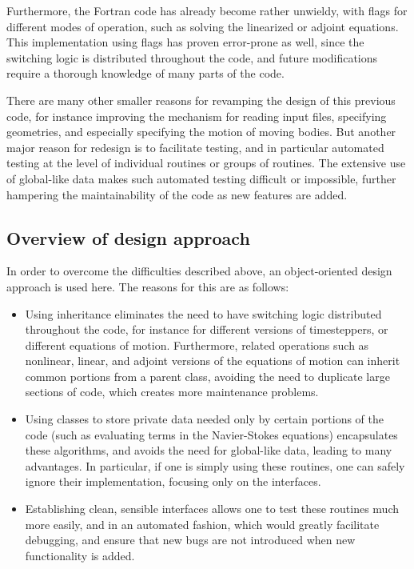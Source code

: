 \documentclass[11pt]{article}
\begin{document}
Furthermore, the Fortran code has already become rather unwieldy, with flags for different modes of operation, such as solving the linearized or adjoint equations.  This implementation using flags has proven error-prone as well, since the switching logic is distributed throughout the code, and future modifications require a thorough knowledge of many parts of the code.

There are many other smaller reasons for revamping the design of this previous code, for instance improving the mechanism for reading input files, specifying geometries, and especially specifying the motion of moving bodies.  But another major reason for redesign is to facilitate testing, and in particular automated testing at the level of individual routines or groups of routines.  The extensive use of global-like data makes such automated testing difficult or impossible, further hampering the maintainability of the code as new features are added.

\subsection{Overview of design approach}
In order to overcome the difficulties described above, an object-oriented design approach is used here.  The reasons for this are as follows:
\begin{itemize}
	\item Using inheritance eliminates the need to have switching logic distributed throughout the code, for instance for different versions of timesteppers, or different equations of motion.  Furthermore, related operations such as nonlinear, linear, and adjoint versions of the equations of motion can inherit common portions from a parent class, avoiding the need to duplicate large sections of code, which creates more maintenance problems.
	\item Using classes to store private data needed only by certain portions of the code (such as evaluating terms in the Navier-Stokes equations) encapsulates these algorithms, and avoids the need for global-like data, leading to many advantages.  In particular, if one is simply using these routines, one can safely ignore their implementation, focusing only on the interfaces.
	\item Establishing clean, sensible interfaces allows one to test these routines much more easily, and in an automated fashion, which would greatly facilitate debugging, and ensure that new bugs are not introduced when new functionality is added.
\end{itemize}
\end{document}
